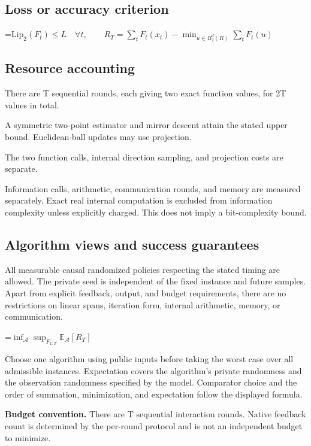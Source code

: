 \documentclass[10pt,a4paper]{article}
\newcommand{\AtlasMath}[1]{\par\begingroup\centering\setbox0=\hbox{$\displaystyle #1$}\ifdim\wd0>1.4\linewidth\typeout{ATLAS WIDE FORMULA: \the\wd0}\fi\ifdim\wd0>\linewidth\resizebox{\linewidth}{!}{\box0}\else\box0\fi\par\endgroup}
\begin{document}
\subsection{Loss or accuracy criterion}

\AtlasMath{\mathrm{Lip}_2(F_t)\le L\quad\forall t,\qquad R_T=\sum_tF_t(x_t)-\min_{u\in B_2^d(R)}\sum_tF_t(u)}


\subsection{Resource accounting}
There are T sequential rounds, each giving two exact function values, for 2T values in total.

A symmetric two-point estimator and mirror descent attain the stated upper bound. Euclidean-ball updates may use projection.

The two function calls, internal direction sampling, and projection costs are separate.

Information calls, arithmetic, communication rounds, and memory are measured separately. Exact real internal computation is excluded from information complexity unless explicitly charged. This does not imply a bit-complexity bound.

\subsection{Algorithm views and success guarantees}
All measurable causal randomized policies respecting the stated timing are allowed. The private seed is independent of the fixed instance and future samples. Apart from explicit feedback, output, and budget requirements, there are no restrictions on linear spans, iteration form, internal arithmetic, memory, or communication.


\AtlasMath{\inf_{\mathcal{A}}\sup_{F_{1:T}}\mathbb{E}_{\mathcal{A}}[R_T]}


Choose one algorithm using public inputs before taking the worst case over all admissible instances. Expectation covers the algorithm's private randomness and the observation randomness specified by the model. Comparator choice and the order of summation, minimization, and expectation follow the displayed formula.

\textbf{Budget convention.} There are T sequential interaction rounds. Native feedback count is determined by the per-round protocol and is not an independent budget to minimize.
\end{document}
